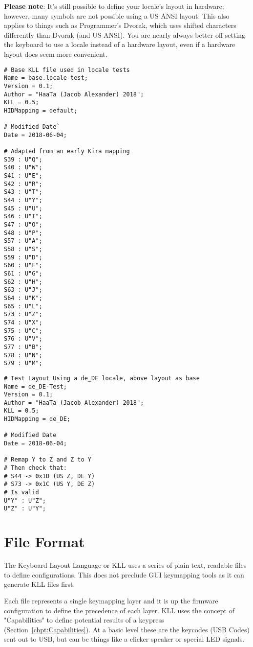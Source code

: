 \documentclass{kiibohd-template}
\begin{document}
\textbf{Please note}: It's still possible to define your locale's layout in hardware; however, many symbols are not possible using a US ANSI layout.
This also applies to things such as Programmer's Dvorak, which uses shifted characters differently than Dvorak (and US ANSI).
You are nearly always better off setting the keyboard to use a locale instead of a hardware layout, even if a hardware layout does seem more convenient.

\begin{lstlisting}
# Base KLL file used in locale tests
Name = base.locale-test;
Version = 0.1;
Author = "HaaTa (Jacob Alexander) 2018";
KLL = 0.5;
HIDMapping = default;

# Modified Date`
Date = 2018-06-04;

# Adapted from an early Kira mapping
S39 : U"Q";
S40 : U"W";
S41 : U"E";
S42 : U"R";
S43 : U"T";
S44 : U"Y";
S45 : U"U";
S46 : U"I";
S47 : U"O";
S48 : U"P";
S57 : U"A";
S58 : U"S";
S59 : U"D";
S60 : U"F";
S61 : U"G";
S62 : U"H";
S63 : U"J";
S64 : U"K";
S65 : U"L";
S73 : U"Z";
S74 : U"X";
S75 : U"C";
S76 : U"V";
S77 : U"B";
S78 : U"N";
S79 : U"M";
\end{lstlisting}

\begin{lstlisting}
# Test Layout Using a de_DE locale, above layout as base
Name = de_DE-Test;
Version = 0.1;
Author = "HaaTa (Jacob Alexander) 2018";
KLL = 0.5;
HIDMapping = de_DE;

# Modified Date
Date = 2018-06-04;

# Remap Y to Z and Z to Y
# Then check that:
# S44 -> 0x1D (US Z, DE Y)
# S73 -> 0x1C (US Y, DE Z)
# Is valid
U"Y" : U"Z";
U"Z" : U"Y";
\end{lstlisting}




\chapter{File Format}

The Keyboard Layout Language or KLL uses a series of plain text, readable files to define configurations.
This does not preclude GUI keymapping tools as it can generate KLL files first.

Each file represents a single keymapping layer and it is up the firmware configuration to define the precedence of each layer.
KLL uses the concept of "Capabilities" to define potential results of a keypress (Section~\ref{chpt:Capabilities}).
At a basic level these are the keycodes (USB Codes) sent out to USB, but can be things like a clicker speaker or special LED signals.
\end{document}
